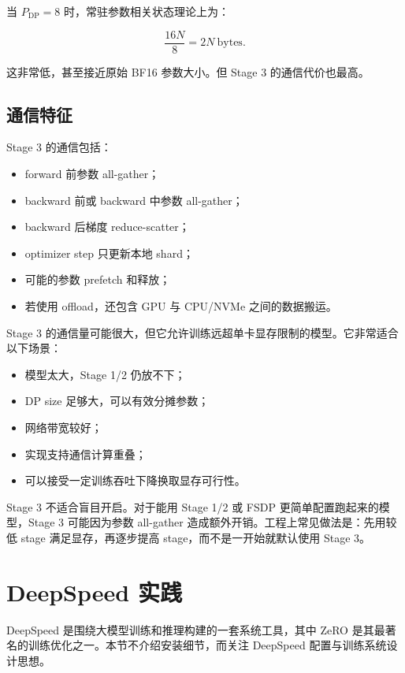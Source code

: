 当 $P_{\mathrm{DP}}=8$ 时，常驻参数相关状态理论上为：

\[
\frac{16N}{8}=2N\ \mathrm{bytes}.
\]

这非常低，甚至接近原始 BF16 参数大小。但 Stage 3 的通信代价也最高。

\subsection{通信特征}
\label{subsec:zero3-communication}

Stage 3 的通信包括：

\begin{itemize}
\item forward 前参数 all-gather；
\item backward 前或 backward 中参数 all-gather；
\item backward 后梯度 reduce-scatter；
\item optimizer step 只更新本地 shard；
\item 可能的参数 prefetch 和释放；
\item 若使用 offload，还包含 GPU 与 CPU/NVMe 之间的数据搬运。
\end{itemize}

Stage 3 的通信量可能很大，但它允许训练远超单卡显存限制的模型。它非常适合以下场景：

\begin{itemize}
\item 模型太大，Stage 1/2 仍放不下；
\item DP size 足够大，可以有效分摊参数；
\item 网络带宽较好；
\item 实现支持通信计算重叠；
\item 可以接受一定训练吞吐下降换取显存可行性。
\end{itemize}

Stage 3 不适合盲目开启。对于能用 Stage 1/2 或 FSDP 更简单配置跑起来的模型，Stage 3 可能因为参数 all-gather 造成额外开销。工程上常见做法是：先用较低 stage 满足显存，再逐步提高 stage，而不是一开始就默认使用 Stage 3。

\section{DeepSpeed 实践}
\label{sec:deepspeed-practice}

DeepSpeed 是围绕大模型训练和推理构建的一套系统工具，其中 ZeRO 是其最著名的训练优化之一。本节不介绍安装细节，而关注 DeepSpeed 配置与训练系统设计思想。

